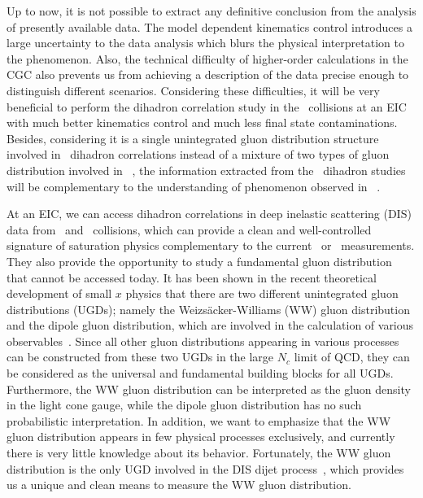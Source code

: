 Up to now, it is not possible to extract any definitive conclusion from the
analysis of presently available data. The model dependent kinematics control
introduces a large uncertainty to the data analysis which blurs the
physical interpretation to the phenomenon. Also, the technical difficulty of
higher-order calculations in the CGC also prevents us from achieving a
description of the data precise enough to distinguish different scenarios.
Considering these difficulties, it will be very beneficial to perform the
dihadron correlation study in the \eA\ collisions at an EIC with much better
kinematics control and much less final state contaminations. Besides,
considering it is a single unintegrated gluon distribution structure involved in
\eA\ dihadron correlations instead of a mixture of two types of gluon distribution
involved in \dA\ , the information extracted from the \eA\ dihadron studies will
be complementary to the understanding of phenomenon observed in \dA\ .



At an EIC, we can access dihadron correlations in deep inelastic scattering
(DIS) data from \eA\ and \ep\ collisions, which can provide a clean and
well-controlled signature of saturation physics complementary to the current \dA\
or \pA\ measurements. They also provide the opportunity to study a fundamental
gluon distribution that cannot be accessed today. It has been shown in the
recent theoretical development of small $x$ physics that there are two different
unintegrated gluon distributions (UGDs); namely the Weizs\"{a}cker-Williams (WW)
gluon distribution and the dipole gluon distribution, which are involved in the
calculation of various observables~\cite{Dominguez:2010xd}. Since all other
gluon distributions appearing in various processes can be constructed from these
two UGDs in the large $N_c$ limit of QCD, they can be considered as the
universal and fundamental building blocks for all UGDs. Furthermore, the WW
gluon distribution can be interpreted as the gluon density in the light cone
gauge, while the dipole gluon distribution has no such probabilistic
interpretation. In addition, we want to emphasize that the WW gluon distribution
appears in few physical processes exclusively, and currently there is very
little knowledge about its behavior. Fortunately, the WW gluon distribution is
the only UGD involved in the DIS dijet process~\cite{Dominguez:2011wm}, which
provides us a unique and clean means to measure the WW gluon distribution.



